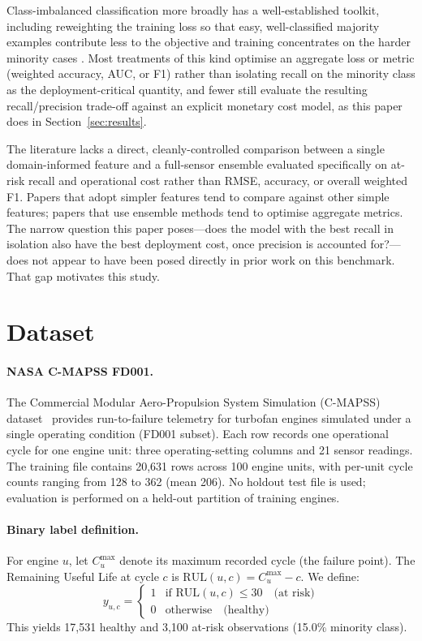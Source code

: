 \documentclass[10pt,twocolumn]{article}
\begin{document}
Class-imbalanced classification more broadly has a well-established toolkit,
including reweighting the training loss so that easy, well-classified majority
examples contribute less to the objective and training concentrates on the harder
minority cases \cite{lin2017focal}.
Most treatments of this kind optimise an aggregate loss or metric (weighted accuracy,
AUC, or F1) rather than isolating recall on the minority class as the deployment-critical
quantity, and fewer still evaluate the resulting recall/precision trade-off against an
explicit monetary cost model, as this paper does in Section~\ref{sec:results}.

The literature lacks a direct, cleanly-controlled comparison between a single
domain-informed feature and a full-sensor ensemble evaluated specifically on at-risk
recall and operational cost rather than RMSE, accuracy, or overall weighted F1.
Papers that adopt simpler features tend to compare against other simple features;
papers that use ensemble methods tend to optimise aggregate metrics.
The narrow question this paper poses---does the model with the best recall in
isolation also have the best deployment cost, once precision is accounted for?---does
not appear to have been posed directly in prior work on this benchmark.
That gap motivates this study.

\section{Dataset}
\label{sec:data}

\paragraph{NASA C-MAPSS FD001.}
The Commercial Modular Aero-Propulsion System Simulation (C-MAPSS)
dataset~\cite{saxena2008damage} provides run-to-failure telemetry for turbofan engines
simulated under a single operating condition (FD001 subset).
Each row records one operational cycle for one engine unit: three operating-setting
columns and 21 sensor readings.
The training file contains 20,631 rows across 100 engine units, with per-unit cycle
counts ranging from 128 to 362 (mean 206).
No holdout test file is used; evaluation is performed on a held-out partition of
training engines.

\paragraph{Binary label definition.}
For engine $u$, let $C_u^{\max}$ denote its maximum recorded cycle (the failure point).
The Remaining Useful Life at cycle $c$ is $\mathrm{RUL}(u,c)=C_u^{\max}-c$.
We define:
\begin{equation}
  y_{u,c}=
  \begin{cases}
    1 & \text{if }\mathrm{RUL}(u,c)\leq 30 \quad\text{(at risk)}\\
    0 & \text{otherwise}\quad\text{(healthy)}
  \end{cases}
\end{equation}
This yields 17,531 healthy and 3,100 at-risk observations (15.0\% minority class).
\end{document}
